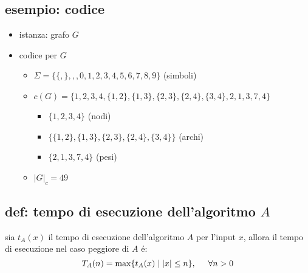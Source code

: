 \subsection*{esempio: codice}
\begin{flushleft}
	\begin{itemize}
		\item istanza: grafo $G$
	\end{itemize}
\end{flushleft}
\begin{center}
\end{center}
\begin{flushleft}
	\begin{itemize}
		\item codice per $G$
		\begin{itemize}
			\item $\Sigma=\{\{,\},,,0,1,2,3,4,5,6,7,8,9\}$ (simboli)
			\item $c(G)=\{1,2,3,4,\{1,2\},\{1,3\},\{2,3\},\{2,4\},\{3,4\},2,1,3,7,4\}$
			\begin{itemize}
				\item $\{1,2,3,4\}$ (nodi)
				\item $\{\{1,2\},\{1,3\},\{2,3\},\{2,4\},\{3,4\}\}$ (archi)
				\item $\{2,1,3,7,4\}$ (pesi)
			\end{itemize}
			\item $|G|_{c}=49$
		\end{itemize}
	\end{itemize}
\end{flushleft}


\subsection*{def: tempo di esecuzione dell'algoritmo $A$}
\begin{flushleft}
	sia $t_{A}(x)$ il tempo di esecuzione dell'algoritmo $A$ per l'input $x$, allora il tempo di esecuzione nel caso peggiore di $A$ \'e: $$T_{A}(n)=\max\{t_{A}(x)\hspace{0.1cm}|\hspace{0.1cm}|x|\leq n\},\hspace{0.5cm}\forall n>0$$
\end{flushleft}

